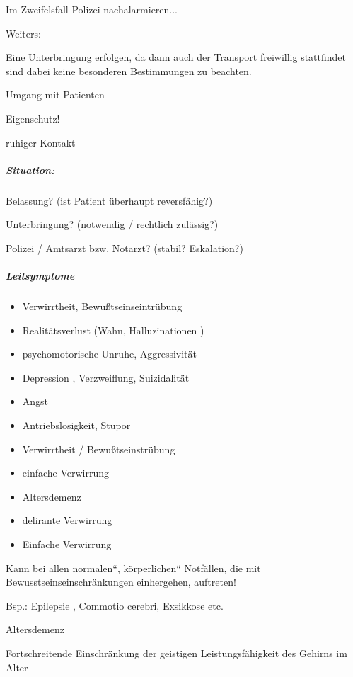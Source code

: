 Im Zweifelsfall Polizei nachalarmieren...

{\color{black}
Weiters: }


Eine Unterbringung 
erfolgen, da dann auch der Transport freiwillig stattfindet sind dabei
keine besonderen Bestimmungen zu beachten.

{\mdseries\color[rgb]{0.0,0.0,0.5019608}
Umgang mit Patienten}

{\mdseries
Eigenschutz!}

{\mdseries
ruhiger Kontakt}

\subparagraph*{
Situation:}

{\mdseries
Belassung? (ist Patient \"uberhaupt  reversfähig?)}

{\mdseries
Unterbringung? (notwendig / rechtlich  zulässig?)}

{\mdseries
Polizei / Amtsarzt bzw. Notarzt? (stabil?  Eskalation?)}

\subparagraph*{Leitsymptome}

\begin{itemize}
\item Verwirrtheit, Bewu{\ss}tseinseintr\"ubung
\item Realitätsverlust (Wahn, Halluzinationen )
\item psychomotorische Unruhe, Aggressivität
\item Depression , Verzweiflung, Suizidalität
\item Angst
\item Antriebslosigkeit, Stupor
\item Verwirrtheit / Bewu{\ss}tseinstr\"ubung
\item einfache Verwirrung
\item Altersdemenz
\item delirante Verwirrung
\item Einfache Verwirrung

\end{itemize}
{\mdseries
Kann bei allen {\quotedblbase}normalen{\textquotedblleft},
{\quotedblbase}körperlichen{\textquotedblleft} Notfällen, die mit
Bewusstseins\-ein\-schränkungen ein\-her\-gehen, auftreten!}

{\mdseries
Bsp.: Epilepsie , Commotio cerebri, Exsikkose etc.}

{\mdseries\color[rgb]{0.0,0.0,0.5019608}
Altersdemenz}

{\mdseries
Fortschreitende Einschränkung der  geistigen Leistungsfähigkeit des
Gehirns  im Alter}

